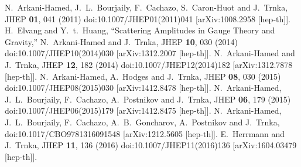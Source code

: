 \documentclass[letter,11pt]{article}
\begin{document}
\newpage
\begin{thebibliography}{99}
N.~Arkani-Hamed, J.~L.~Bourjaily, F.~Cachazo, S.~Caron-Huot and J.~Trnka,
JHEP \textbf{01}, 041 (2011)
doi:10.1007/JHEP01(2011)041
[arXiv:1008.2958 [hep-th]].
H.~Elvang and Y.~t.~Huang,
``Scattering Amplitudes in Gauge Theory and Gravity,''
N.~Arkani-Hamed and J.~Trnka,
JHEP \textbf{10}, 030 (2014)
doi:10.1007/JHEP10(2014)030
[arXiv:1312.2007 [hep-th]].
N.~Arkani-Hamed and J.~Trnka,
JHEP \textbf{12}, 182 (2014)
doi:10.1007/JHEP12(2014)182
[arXiv:1312.7878 [hep-th]].
N.~Arkani-Hamed, A.~Hodges and J.~Trnka,
JHEP \textbf{08}, 030 (2015)
doi:10.1007/JHEP08(2015)030
[arXiv:1412.8478 [hep-th]].
N.~Arkani-Hamed, J.~L.~Bourjaily, F.~Cachazo, A.~Postnikov and J.~Trnka,
JHEP \textbf{06}, 179 (2015)
doi:10.1007/JHEP06(2015)179
[arXiv:1412.8475 [hep-th]].
N.~Arkani-Hamed, J.~L.~Bourjaily, F.~Cachazo, A.~B.~Goncharov, A.~Postnikov and J.~Trnka,
doi:10.1017/CBO9781316091548
[arXiv:1212.5605 [hep-th]].
E.~Herrmann and J.~Trnka,
JHEP \textbf{11}, 136 (2016)
doi:10.1007/JHEP11(2016)136
[arXiv:1604.03479 [hep-th]].
\end{thebibliography}
\end{document}
